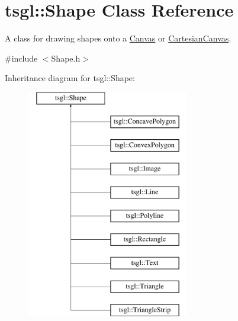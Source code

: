 \hypertarget{classtsgl_1_1_shape}{\section{tsgl\-:\-:Shape Class Reference}
\label{classtsgl_1_1_shape}
}


A class for drawing shapes onto a \hyperlink{classtsgl_1_1_canvas}{Canvas} or \hyperlink{classtsgl_1_1_cartesian_canvas}{Cartesian\-Canvas}.  




{\ttfamily \#include $<$Shape.\-h$>$}

Inheritance diagram for tsgl\-:\-:Shape\-:\begin{figure}[H]
\begin{center}
\leavevmode
\includegraphics[height=10.000000cm]{classtsgl_1_1_shape}
\end{center}
\end{figure}
